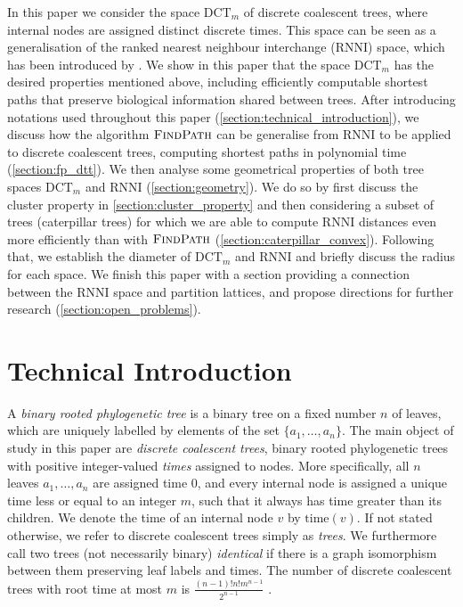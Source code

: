 \documentclass[11pt]{amsart}
\newcommand{\rnni}{\mathrm{RNNI}}
\newcommand{\findpath}{\textsc{FindPath}}
\newcommand{\ntime}{\mathrm{time}}
\newcommand{\dtt}{\mathrm{DCT}}
\newcommand{\summary}[1]{} %
\begin{document}
\summary{Structure of the paper.}
In this paper we consider the space $\dtt_m$ of discrete coalescent trees, where internal nodes are assigned distinct discrete times.
This space can be seen as a generalisation of the ranked nearest neighbour interchange ($\rnni$) space, which has been introduced by \textcite{Collienne2020-iu}.
We show in this paper that the space $\dtt_m$ has the desired properties mentioned above, including efficiently computable shortest paths that preserve biological information shared between trees.
After introducing notations used throughout this paper (\autoref{section:technical_introduction}), we discuss how the algorithm $\findpath$ \autocite{Collienne2020-iu} can be generalise from $\rnni$ to be applied to discrete coalescent trees, computing shortest paths in polynomial time (\autoref{section:fp_dtt}).
We then analyse some geometrical properties of both tree spaces $\dtt_m$ and $\rnni$ (\autoref{section:geometry}).
We do so by first discuss the cluster property in \autoref{section:cluster_property} and then considering a subset of trees (caterpillar trees) for which we are able to compute $\rnni$ distances even more efficiently than with $\findpath$ (\autoref{section:caterpillar_convex}).
Following that, we establish the diameter of $\dtt_m$ and $\rnni$ and briefly discuss the radius for each space.
We finish this paper with a section providing a connection between the $\rnni$ space and partition lattices, and propose directions for further research (\autoref{section:open_problems}).


\section{Technical Introduction}
\label{section:technical_introduction}

\summary{Introducing discrete coalescent trees and ranked trees}
A \emph{binary rooted phylogenetic tree} is a binary tree on a fixed number $n$ of leaves, which are uniquely labelled by elements of the set $\{a_1, \ldots, a_n\}$.
The main object of study in this paper are \emph{discrete coalescent trees}, binary rooted phylogenetic trees with positive integer-valued \emph{times} assigned to nodes.
More specifically, all $n$ leaves $a_1, \ldots, a_n$ are assigned time $0$, and every internal node is assigned a unique time less or equal to an integer $m$, such that it always has time greater than its children.
We denote the time of an internal node $v$ by $\ntime(v)$.
If not stated otherwise, we refer to discrete coalescent trees simply as \emph{trees}.
We furthermore call two trees (not necessarily binary) \emph{identical} if there is a graph isomorphism between them preserving leaf labels and times.
The number of discrete coalescent trees with root time at most $m$ is $\frac{(n-1)!n!m^{n-1}}{2^{n-1}}$ \autocite{Gavryushkin2018-ol}.
\end{document}
